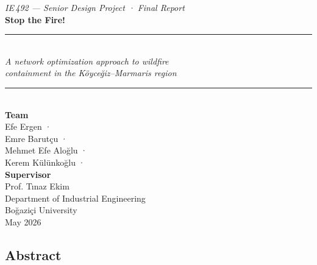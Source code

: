 \documentclass[
  11pt,
]{article}
\author{}
\date{}
\begin{document}
\begin{titlepage}
\thispagestyle{empty}
\vspace*{6em}
\begin{center}
{\itshape IE\,492 — Senior Design Project · Final Report}\\[3em]
{\fontsize{32pt}{36pt}\selectfont\bfseries Stop the Fire!}\\[1.2em]
\rule{0.6\textwidth}{0.4pt}\\[1.2em]
{\large\itshape A network optimization approach to wildfire\\
containment in the Köyceğiz–Marmaris region}\\[1.2em]
\rule{0.6\textwidth}{0.4pt}\\[4em]
{\bfseries Team}\\[0.4em]
Efe Ergen \quad·\\
Emre Barutçu \quad·\\
Mehmet Efe Aloğlu \quad·\\
Kerem Külünkoğlu \quad·\\[2.5em]
{\bfseries Supervisor}\\[0.4em]
Prof. Tınaz Ekim\\[6em]
Department of Industrial Engineering\\
Boğaziçi University\\
May 2026
\end{center}
\end{titlepage}

\tableofcontents
\newpage

\subsection{Abstract}\label{abstract}
\end{document}
